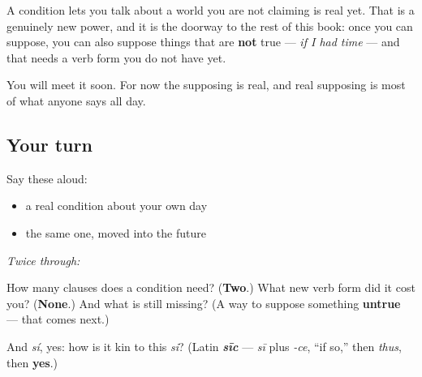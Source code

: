 \begin{grammarlens}[title={Grammar Lens: what a condition is for}]
A condition lets you talk about a world you are not claiming is real yet. That is a genuinely new power, and it is the doorway to the rest of this book: once you can suppose, you can also suppose things that are \textbf{not} true — \emph{if I had time} — and that needs a verb form you do not have yet.

You will meet it soon. For now the supposing is real, and real supposing is most of what anyone says all day.
\end{grammarlens}

\subsection*{Your turn}
Say these aloud:

\begin{itemize}
\raggedright
  \item a real condition about your own day
  \item the same one, moved into the future
\end{itemize}

\emph{Twice through:}

\begin{tcolorbox}[breakable,colback=teal!4,colframe=teal!35!black,title={Before you move on}]
How many clauses does a condition need? (\textbf{Two}.) What new verb form did it cost you? (\textbf{None}.) And what is still missing? (A way to suppose something \textbf{untrue} — that comes next.)

And \emph{sí}, yes: how is it kin to this \emph{si}? (Latin \emph{\textbf{sīc}} — \emph{sī} plus \emph{-ce}, \textquotedblleft{}if so,\textquotedblright{} then \emph{thus}, then \textbf{yes}.)
\end{tcolorbox}
